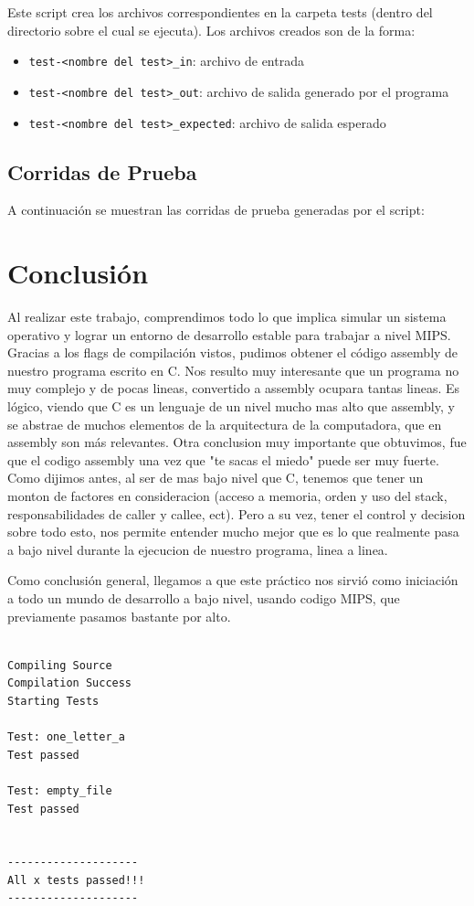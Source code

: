 \documentclass[11pt,a4paper]{article}
\begin{document}
Este script crea los archivos correspondientes en la carpeta tests (dentro del directorio sobre el cual se ejecuta).
Los archivos creados son de la forma:

\begin{itemize}
	\item \texttt{test-<nombre del test>\_in}: archivo de entrada
	\item \texttt{test-<nombre del test>\_out}: archivo de salida generado por el programa
	\item \texttt{test-<nombre del test>\_expected}: archivo de salida esperado
\end{itemize}

\subsection{Corridas de Prueba}
A continuación se muestran las corridas de prueba generadas por el script:

\section{Conclusión}
Al realizar este trabajo, comprendimos todo lo que implica simular un sistema operativo y lograr un entorno de desarrollo estable para trabajar a nivel MIPS.
Gracias a  los flags de compilación vistos, pudimos obtener el código assembly de nuestro programa escrito en C. Nos resulto muy interesante que un programa no muy complejo y de pocas lineas, convertido a assembly ocupara tantas lineas. Es lógico, viendo que C es un lenguaje de un nivel mucho mas alto que assembly, y se abstrae de muchos elementos de la arquitectura de la computadora, que en assembly son más relevantes.
Otra conclusion muy importante que obtuvimos, fue que el codigo assembly una vez que "te sacas el miedo" puede ser muy fuerte. Como dijimos antes, al ser de mas bajo nivel que C, tenemos que tener un monton de factores en consideracion (acceso a memoria, orden y uso del stack, responsabilidades de caller y callee, ect). Pero a su vez, tener el control y decision sobre todo esto, nos permite entender mucho mejor que es lo que realmente pasa a bajo nivel durante la ejecucion de nuestro programa, linea a linea.

Como conclusión general, llegamos a que este práctico nos sirvió como iniciación a todo un mundo de desarrollo a bajo nivel, usando codigo MIPS, que previamente pasamos bastante por alto.

\begin{lstlisting}

Compiling Source
Compilation Success
Starting Tests

Test: one_letter_a
Test passed

Test: empty_file
Test passed


--------------------
All x tests passed!!!
--------------------
\end{lstlisting}
\end{document}
